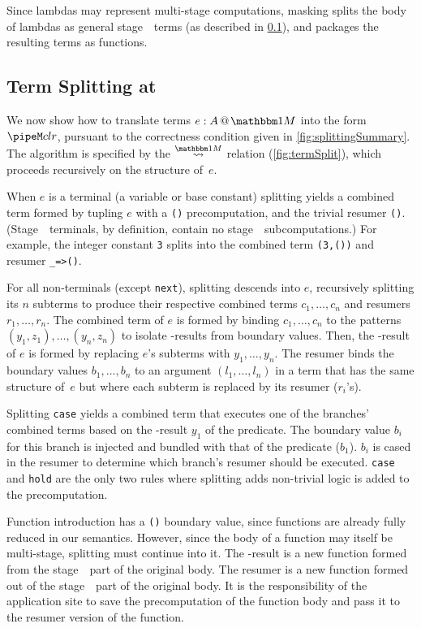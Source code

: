 \begin{abstrsyn}
Since lambdas may represent multi-stage computations, 
masking splits the body of lambdas as general stage~\bbone\ terms (as described in \ref{sec:split-one}), 
and packages the resulting terms as functions.

\subsection{Term Splitting at \bbonem}
\label{sec:split-one}

We now show how to translate terms $\colmix e A$ into the form $\pipeM c l r$,
pursuant to the correctness condition given in \ref{fig:splittingSummary}.
The algorithm is specified by the $\splitonesym$ relation (\cref{fig:termSplit}), 
which proceeds recursively on the structure of~$e$.

When $e$ is a terminal (a variable or base constant)
splitting yields a combined term formed by tupling $e$ with a \texttt{()} precomputation, 
and the trivial resumer \texttt{()}. 
(Stage~\bbone\ terminals, by definition, contain no stage~\bbtwo\ subcomputations.)  
For example, the integer constant \texttt{3} splits into the combined term \texttt{(3,())} and resumer \texttt{\_=>()}.

For all non-terminals (except \texttt{next}),
splitting descends into $e$, recursively splitting its $n$ subterms
to produce their respective combined terms $c_1,\ldots,c_n$ and resumers $r_1, \ldots, r_n$.
The combined term of $e$ is formed by binding $c_1,\ldots,c_n$
to the patterns $(y_1,z_1),\ldots,(y_n,z_n)$
to isolate \bbone-results from boundary values. Then,
the \bbone-result of $e$ is formed by replacing $e$'s subterms with $y_1,\ldots,y_n$.
The resumer binds the boundary values $b_1,\ldots,b_n$ to an
argument $(l_1,\ldots,l_n)$ in a term that has the same structure
of~$e$ but where each subterm is replaced by its resumer ($r_i$'s).

Splitting {\tt case} yields a combined term that executes one of the branches' combined terms based on the \bbone-result $y_1$ of the predicate.
The boundary value $b_i$ for this branch is injected and bundled with that of the predicate ($b_1$).   
$b_i$ is cased in the resumer to determine which branch's resumer should be executed.
{\tt case} and \texttt{hold} are the only two rules where splitting adds non-trivial logic is added to the precomputation.

Function introduction has a \texttt{()} boundary value,
since functions are already fully reduced in our semantics.
However, since the body of a function may itself be multi-stage, splitting must continue into it.
The \bbone-result is a new function formed from the stage~\bbone\ part of the original body.
The resumer is a new function formed out of the stage~\bbtwo\ part of the original body.
It is the responsibility of the application site to save the precomputation of the function body
and pass it to the resumer version of the function.


\end{abstrsyn}
